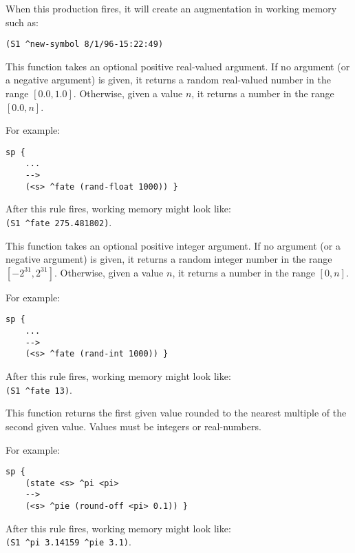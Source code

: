 \begin{description}
When this production fires, it will create an augmentation in working
memory such as:

\begin{verbatim}
(S1 ^new-symbol 8/1/96-15:22:49)
\end{verbatim}    


\item [\soarb{rand-float} --- ] This function takes an optional positive real-valued argument.
If no argument (or a negative argument) is given, it returns a random real-valued number in the range $[0.0,1.0]$.
Otherwise, given a value $n$, it returns a number in the range $[0.0, n]$.

For example:

\begin{verbatim}
sp {
    ...
    -->
    (<s> ^fate (rand-float 1000)) }
\end{verbatim}

After this rule fires, working memory might look like: \\
\verb|(S1 ^fate 275.481802)|.


\item [\soarb{rand-int} --- ] This function takes an optional positive integer argument.
If no argument (or a negative argument) is given, it returns a random integer number in the range $[-2^{31}, 2^{31}]$.
Otherwise, given a value $n$, it returns a number in the range $[0, n]$.

For example:

\begin{verbatim}
sp {
    ...
    -->
    (<s> ^fate (rand-int 1000)) }
\end{verbatim}

After this rule fires, working memory might look like: \\
\verb|(S1 ^fate 13)|.


\item [\soarb{round-off} --- ] This function returns the first given 
value rounded to the nearest multiple of the second given value.
Values must be integers or real-numbers.

For example:

\begin{verbatim}
sp {
    (state <s> ^pi <pi>
    -->
    (<s> ^pie (round-off <pi> 0.1)) }
\end{verbatim}

After this rule fires, working memory might look like: \\
\verb|(S1 ^pi 3.14159 ^pie 3.1)|.



\end{description}
